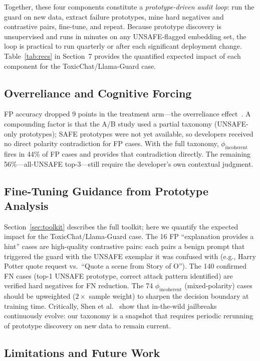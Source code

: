 \documentclass[letterpaper]{article}
\begin{document}
Together, these four components constitute a \emph{prototype-driven audit loop}: run
the guard on new data, extract failure prototypes, mine hard negatives and contrastive
pairs, fine-tune, and repeat. Because prototype discovery is unsupervised and runs in
minutes on any UNSAFE-flagged embedding set, the loop is practical to run quarterly or
after each significant deployment change. Table~\ref{tab:recs} in Section~7 provides
the quantified expected impact of each component for the ToxicChat/Llama-Guard case.

\subsection{Overreliance and Cognitive Forcing}

FP accuracy dropped 9 points in the treatment arm---the overreliance
effect~\cite{buccinca2021trust}. A compounding factor is that the A/B study used a
partial taxonomy (UNSAFE-only prototypes); SAFE prototypes were not yet available,
so developers received no direct polarity contradiction for FP cases. With the full
taxonomy, $\phi_\text{incoherent}$ fires in 44\% of FP cases and provides that
contradiction directly. The remaining 56\%---all-UNSAFE top-3---still require the
developer's own contextual judgment.

\subsection{Fine-Tuning Guidance from Prototype Analysis}

Section~\ref{sec:toolkit} describes the full toolkit; here we quantify the expected
impact for the ToxicChat/Llama-Guard case.
The 16 FP ``explanation provides a hint'' cases are high-quality contrastive pairs:
each pairs a benign prompt that triggered the guard with the UNSAFE exemplar it was
confused with (e.g., Harry Potter quote request vs.\ ``Quote a scene from Story of O'').
The 140 confirmed FN cases (top-1 UNSAFE prototype, correct attack pattern identified)
are verified hard negatives for FN reduction. The 74 $\phi_\text{incoherent}$ (mixed-polarity) cases
should be upweighted ($2\times$ sample weight) to sharpen the decision boundary at
training time. Critically, Shen et al.~\cite{shen2024dan} show that in-the-wild
jailbreaks continuously evolve: our taxonomy is a snapshot that requires periodic
rerunning of prototype discovery on new data to remain current.

\subsection{Limitations and Future Work}
\end{document}
